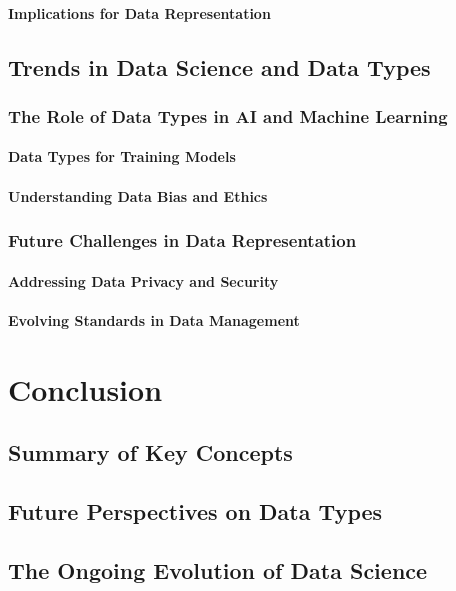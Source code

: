 \documentclass[12pt, oneside]{book}
\begin{document}
\subsubsection{Implications for Data Representation}
\section{Trends in Data Science and Data Types}
\subsection{The Role of Data Types in AI and Machine Learning}
\subsubsection{Data Types for Training Models}
\subsubsection{Understanding Data Bias and Ethics}
\subsection{Future Challenges in Data Representation}
\subsubsection{Addressing Data Privacy and Security}
\subsubsection{Evolving Standards in Data Management}

\chapter{Conclusion}
\section{Summary of Key Concepts}
\section{Future Perspectives on Data Types}
\section{The Ongoing Evolution of Data Science}
\end{document}
